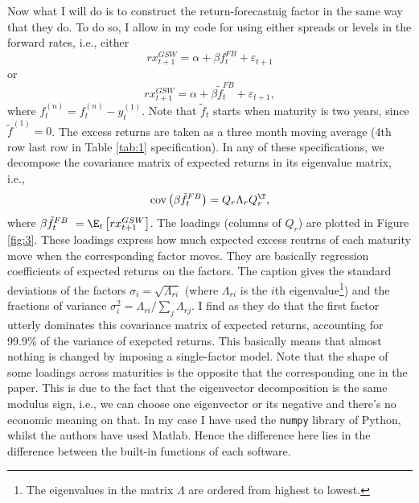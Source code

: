 Now what I will do is to construct the return-forecastnig factor in the same way that they do. To do so, I allow in my code for using either spreads or levels in the forward rates, i.e., either
\begin{equation}
	rx_{t+1}^{GSW} = \alpha + \beta f_t^{FB} + \varepsilon_{t+1}
\end{equation}
or
\begin{equation}
	rx_{t+1}^{GSW} = \alpha + \beta \tilde{f}_t^{FB} + \varepsilon_{t+1},
\end{equation}
where $f_t^{(n)} = f_t^{(n)} - y_t^{(1)}$. Note that $\tilde{f}_t$ starts when maturity is two years, since $\tilde{f}^{(1)} = 0$. The excess returns are taken as a three month moving average (4th row last row in Table \ref{tab:1} specification). In any of these specifications, we decompose the covariance matrix of expected returns in its eigenvalue matrix, i.e.,
\begin{equation}
	\text{cov}\left(\beta\tilde{f}_t^{FB}\right) = Q_r \Lambda_r Q_r^\T,
\end{equation}
where $\beta\tilde{f}_t^{FB}\ = \E_t\left[rx_{t+1}^{GSW}\right]$. The loadings (columns of $Q_r$) are plotted in Figure \ref{fig:3}. These loadings express how much expected excess reutrns of each maturity move when the corresponding factor moves. They are basically regression coefficients of expected returns on the factors. The caption gives the standard deviations of the factors $\sigma_i = \sqrt{\Lambda_{ri}}$ (where $\Lambda_{ri}$ is the $i$th eigenvalue\footnote{The eigenvalues in the matrix $\Lambda$ are ordered from highest to lowest.}) and the fractions of variance $\sigma_i^2 = \Lambda_{ri} / \sum_{j} \Lambda_{rj}$. I find as they do that the first factor utterly dominates this covariance matrix of expected returns, accounting for 99.9\% of the variance of exepcted returns. This basically means that almost nothing is changed by imposing a single-factor model. Note that the shape of some loadings across maturities is the opposite that the corresponding one in the paper. This is due to the fact that the eigenvector decomposition is the same modulus sign, i.e., we can choose one eigenvector or its negative and there's no economic meaning on that. In my case I have used the \texttt{numpy} library of Python, whilst the authors have used Matlab. Hence the difference here lies in the difference between the built-in functions of each software.



